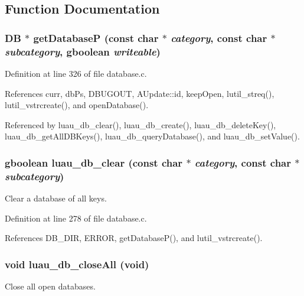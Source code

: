 \subsection{Function Documentation}
\subsubsection{\setlength{\rightskip}{0pt plus 5cm}DB $\ast$ get\-Database\-P (const char $\ast$ {\em category}, const char $\ast$ {\em subcategory}, gboolean {\em writeable})\hspace{0.3cm}{\tt  [static]}}\label{database_8c_a2}




Definition at line 326 of file database.c.

References curr, db\-Ps, DBUGOUT, AUpdate::id, keep\-Open, lutil\_\-streq(), lutil\_\-vstrcreate(), and open\-Database().

Referenced by luau\_\-db\_\-clear(), luau\_\-db\_\-create(), luau\_\-db\_\-delete\-Key(), luau\_\-db\_\-get\-All\-DBKeys(), luau\_\-db\_\-query\-Database(), and luau\_\-db\_\-set\-Value().
\subsubsection{\setlength{\rightskip}{0pt plus 5cm}gboolean luau\_\-db\_\-clear (const char $\ast$ {\em category}, const char $\ast$ {\em subcategory})}\label{database_8c_a12}


Clear a database of all keys. 



Definition at line 278 of file database.c.

References DB\_\-DIR, ERROR, get\-Database\-P(), and lutil\_\-vstrcreate().
\subsubsection{\setlength{\rightskip}{0pt plus 5cm}void luau\_\-db\_\-close\-All (void)}\label{database_8c_a14}


Close all open databases. 



